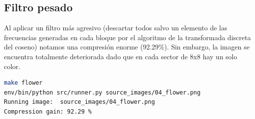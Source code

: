 \documentclass[spanish]{scrartcl}
\begin{document}

\subsection{Filtro pesado}

Al aplicar un filtro más agresivo (descartar todos salvo un elemento de las frecuencias generadas en cada bloque por el algoritmo de la transformada discreta del coseno) notamos una compresión enorme (92.29\%). Sin embargo, la imagen se encuentra totalmente deteriorada dado que en cada sector de 8x8 hay un solo color.


\begin{lstlisting}[language=bash]
make flower
env/bin/python src/runner.py source_images/04_flower.png
Running image:  source_images/04_flower.png
Compression gain: 92.29 %
\end{lstlisting}
\end{document}
